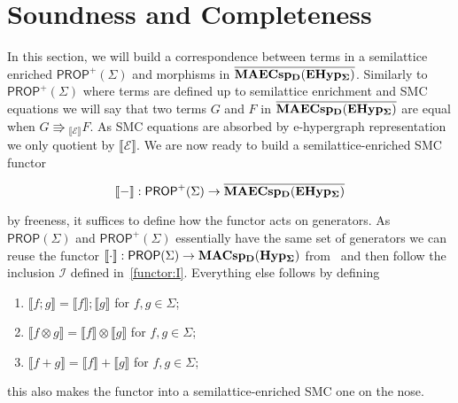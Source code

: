 
\section{Soundness and Completeness}

In this section, we will build a correspondence between terms in a semilattice enriched $\textsf{PROP}^{+}(\Sigma)$ and morphisms in ${\mathbf{\overline{MAECsp_{D}(EHyp_{\Sigma})}}}$. Similarly to $\textsf{PROP}^{+}(\Sigma)$ where terms are defined up to semilattice enrichment and SMC equations we will say that two terms $G$ and $F$ in ${\mathbf{\overline{MAECsp_{D}(EHyp_{\Sigma})}}}$ are equal when $G \Rrightarrow{}_{\llbracket \mathcal{E} \rrbracket} F$. As SMC equations are absorbed by e-hypergraph representation we only quotient by $\llbracket \mathcal{E} \rrbracket$. We are now ready to build a semilattice-enriched SMC functor 

\[
\llbracket - \rrbracket : \textsf{PROP}^{+}(\Sigma) \to {\mathbf{\overline{MAECsp_{D}(EHyp_{\Sigma})}}}
\]

by freeness, it suffices to define how the functor acts on generators. As $\textsf{PROP}(\Sigma)$ and $\textsf{PROP}^{+}(\Sigma)$ essentially have the same set of generators we can reuse the functor $\llbracket \cdot \rrbracket: \textsf{PROP}(\Sigma) \to \mathbf{MACsp_{D}(Hyp_{\Sigma})}$ from~\cite{Frobenius2} and then follow the inclusion $\mathcal{I}$ defined in~\ref{functor:I}. Everything else follows by defining

\begin{enumerate}
    \item $\llbracket f;g \rrbracket = \llbracket f \rrbracket ; \llbracket g \rrbracket$  for $f,g \in \Sigma$;
    \item $\llbracket f \otimes g \rrbracket = \llbracket f \rrbracket \otimes \llbracket g \rrbracket$  for $f,g \in \Sigma$;
    \item $\llbracket f + g \rrbracket = \llbracket f \rrbracket + \llbracket g \rrbracket$  for $f,g \in \Sigma$;
\end{enumerate}

this also makes the functor into a semilattice-enriched SMC one on the nose.


